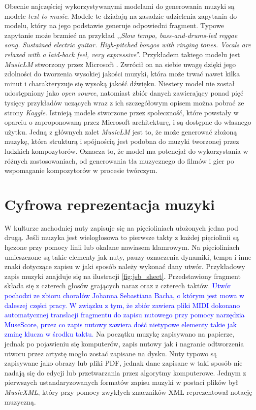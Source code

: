 \documentclass[data-science]{agh-wi} %
\begin{document}
Obecnie najczęściej wykorzystywanymi modelami do generowania muzyki są modele \textit{text-to-music}. Modele te działają na zasadzie udzielenia zapytania do modelu, który na jego podstawie generuje odpowiedni fragment. Typowe zapytanie może brzmieć na przykład ,,\textit{Slow tempo, bass-and-drums-led reggae song. Sustained electric guitar. High-pitched bongos with ringing tones. Vocals are relaxed with a laid-back feel, very expressive}''. Przykładem takiego modelu jest \textit{MusicLM} stworzony przez Microsoft \cite*{agostinelli2023musiclm}. Zwrócił on na siebie uwagę dzięki jego zdolności do tworzenia wysokiej jakości muzyki, która może trwać nawet kilka minut i charakteryzuje się wysoką jakość dźwięku. Niestety model nie został udostępniony jako \textit{open source}, natomiast zbiór danych zawierający ponad pięć tysięcy przykładów uczących wraz z ich szczegółowym opisem można pobrać ze strony \textit{Kaggle}. Istnieją modele stworzone przez społeczność, które powstały w oparciu o zaproponowaną przez Microsoft architekturę, i są dostępne do własnego użytku. Jedną z głównych zalet \textit{MusicLM} jest to, że może generować złożoną muzykę, która strukturą i spójnością jest podobna do muzyki tworzonej przez ludzkich kompozytorów. Oznacza to, że model ma potencjał do wykorzystania w różnych zastosowaniach, od generowania tła muzycznego do filmów i gier po wspomaganie kompozytorów w procesie twórczym.


\section{Cyfrowa reprezentacja muzyki}\label{sec:muzyka_cyfrowa}
W kulturze zachodniej nuty zapisuje się na pięcioliniach ułożonych jedna pod drugą. Jeśli muzyka jest wielogłosowa to pierwsze takty z każdej pięciolinii są łączone przy pomocy linii lub okalane nawiasem klamrowym. Na pięcioliniach umieszczone są takie elementy jak nuty, pauzy oznaczenia dynamiki, tempa i inne znaki dotyczące zapisu w jaki sposób należy wykonać dany utwór. Przykładowy zapis muzyki znajduje się na ilustracji \ref*{fig:jsb_sheet}. Przedstawiony fragment składa się z czterech głosów grających naraz oraz z czterech taktów. \textcolor{blue}{Utwór pochodzi ze zbioru chorałów Johanna Sebastiana Bacha, o którym jest mowa w daleszej części pracy. W związku z tym, że zbiór zawiera pliki MIDI dokonano automatycznej translacji fragmentu do zapisu nutowego przy pomocy narzędzia MuseScore, przez co zapis nutowy zawiera dość nietypowe elementy takie jak zminę klucza w środku taktu.} Na początku muzykę zapisywano na papierze, jednak po pojawieniu się komputerów, zapis nutowy jak i nagranie odtworzenia utworu przez artystę mogło zostać zapisane na dysku. Nuty typowo są zapisywane jako obrazy lub pliki PDF, jednak dane zapisane w taki sposób nie nadają się do edycji lub przetwarzania przez algorytmy komputerowe. Jednym z pierwszych ustandaryzowanych formatów zapisu muzyki w postaci plików był \textit{MusicXML}, który przy pomocy zwykłych znaczników XML reprezentował notację muzyczną.
\end{document}
